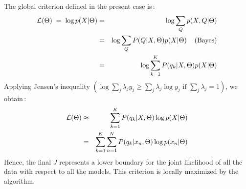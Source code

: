 \documentclass[twoside,a4paper,titlepage]{article}
\begin{document}
The global criterion defined in the present case is\,:
\begin{eqnarray}
{\cal L}(\Theta) \; = \; \log p(X|\Theta)
				& = & \log \sum_Q p(X,Q|\Theta) \nonumber \\
				& = & \log \sum_Q P(Q|X,\Theta) p(X|\Theta) \;\;\;\; \mbox{(Bayes)} \nonumber \\
      			& = & \log \sum_{k=1}^{K} P(q_k|X,\Theta) p(X|\Theta) \nonumber
\end{eqnarray}
Applying Jensen's inequality $\left( \log \sum_j \lambda_j y_j \geq \sum_j
\lambda_j \log y_j \mbox{ if } \sum_j \lambda_j = 1 \right)$, we
obtain\,:
\begin{eqnarray}
{\cal L}(\Theta) & \approx & \sum_{k=1}^{K} P(q_k|X,\Theta) \log p(X|\Theta) \nonumber \\
      & = & \sum_{k=1}^{K} \sum_{n=1}^{N} P(q_k|x_n,\Theta) \log p(x_n|\Theta) \nonumber
\end{eqnarray}
Hence, the final $J$ represents a lower boundary for the joint likelihood of
all the data with respect to all the models. This criterion is locally
maximized by the algorithm.
\end{document}
